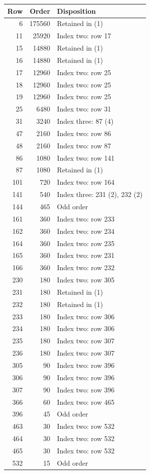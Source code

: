 \begin{longtable}{rrl}
Row&Order&Disposition\\\hline\endhead
6&175560&Retained in (1)\\
11&25920&Index two: row 17\\
15&14880&Retained in (1)\\
16&14880&Retained in (1)\\
17&12960&Index two: row 25\\
18&12960&Index two: row 25\\
19&12960&Index two: row 25\\
25&6480&Index two: row 31\\
31&3240&Index three: 87 (4)\\
47&2160&Index two: row 86\\
48&2160&Index two: row 87\\
86&1080&Index two: row 141\\
87&1080&Retained in (1)\\
101&720&Index two: row 164\\
141&540&Index three: 231 (2), 232 (2)\\
144&465&Odd order\\
161&360&Index two: row 233\\
162&360&Index two: row 234\\
164&360&Index two: row 235\\
165&360&Index two: row 231\\
166&360&Index two: row 232\\
230&180&Index two: row 305\\
231&180&Retained in (1)\\
232&180&Retained in (1)\\
233&180&Index two: row 306\\
234&180&Index two: row 306\\
235&180&Index two: row 307\\
236&180&Index two: row 307\\
305&90&Index two: row 396\\
306&90&Index two: row 396\\
307&90&Index two: row 396\\
366&60&Index two: row 465\\
396&45&Odd order\\
463&30&Index two: row 532\\
464&30&Index two: row 532\\
465&30&Index two: row 532\\
532&15&Odd order\\
\end{longtable}

